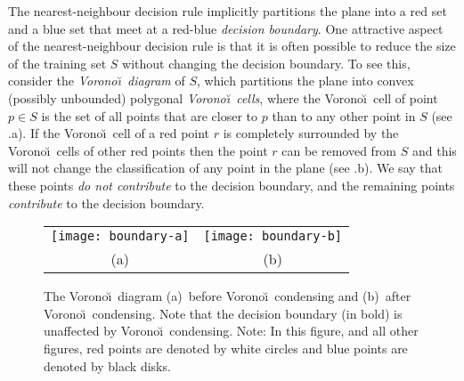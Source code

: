 \documentclass[lotsofwhite,charterfonts]{patmorin}
\newcommand{\voronoi}{Vorono\u\i}
\begin{document}
The nearest-neighbour decision rule implicitly partitions the plane
into a red set and a blue set that meet at a red-blue \emph{decision
boundary}.  One attractive aspect of the nearest-neighbour decision
rule is that it is often possible to reduce the size of the training
set $S$ without changing the decision boundary.  To see this, consider
the \emph{\voronoi\ diagram} of $S$, which partitions the plane into
convex (possibly unbounded) polygonal \emph{\voronoi\ cells}, where
the \voronoi\ cell of point $p\in S$ is the set of all points that are
closer to $p$ than to any other point in $S$ (see .a).
If the \voronoi\ cell of a red point $r$ is completely surrounded by
the \voronoi\ cells of other red points then the point $r$ can be
removed from $S$ and this will not change the classification of any
point in the plane (see .b).   We say that these
points \emph{do not contribute} to the decision boundary, and the
remaining points \emph{contribute} to the decision boundary.


\begin{figure}
\begin{center}\begin{tabular}{cc}
\texttt{[image: boundary-a]} & \texttt{[image: boundary-b]} \\
(a) & (b)
\end{tabular}\end{center}
\caption{The \voronoi\ diagram (a)~before \voronoi\ condensing
and (b)~after \voronoi\ condensing.  Note that the decision boundary
(in bold) is unaffected by \voronoi\ condensing. Note: In this
figure, and all other figures, red points are denoted by white circles 
and blue points are denoted by black disks.}
\end{figure}
\end{document}
